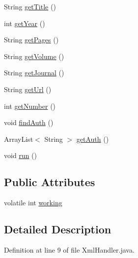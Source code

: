\begin{DoxyCompactItemize}
\item 
String \hyperlink{classXmlHandlerAuthor_a6a6fd1aaef0587d30cff05dfa53da3c3}{get\-Title} ()
\item 
int \hyperlink{classXmlHandlerAuthor_a579ee55f6cf287873e1588943ab920f5}{get\-Year} ()
\item 
String \hyperlink{classXmlHandlerAuthor_acb036e9cc36cf8e042165ec28bfd6443}{get\-Pages} ()
\item 
String \hyperlink{classXmlHandlerAuthor_a6f3d4b439bce3ce234cfaa88a94d79ba}{get\-Volume} ()
\item 
String \hyperlink{classXmlHandlerAuthor_abbd48876dd5f44b21cbd716328b356a7}{get\-Journal} ()
\item 
String \hyperlink{classXmlHandlerAuthor_ae72e80845a09b05b609558a643c8d2d3}{get\-Url} ()
\item 
int \hyperlink{classXmlHandlerAuthor_aaef6b78de7e1405878268e8203807e5d}{get\-Number} ()
\item 
void \hyperlink{classXmlHandlerAuthor_a07d49493bfa706aabe10fe0f7927aa15}{find\-Auth} ()
\item 
Array\-List$<$ String $>$ \hyperlink{classXmlHandlerAuthor_a02f6252baeefc0e7b3458af0a1cde62a}{get\-Auth} ()
\item 
void \hyperlink{classXmlHandlerAuthor_a94447769489224e0cace8278d0fddeb2}{run} ()
\end{DoxyCompactItemize}
\subsection*{Public Attributes}
\begin{DoxyCompactItemize}
\item 
volatile int \hyperlink{classXmlHandlerAuthor_a3b5ed01d09eb68532c727613932065a8}{working}
\end{DoxyCompactItemize}


\subsection{Detailed Description}


Definition at line 9 of file Xml\-Handler.\-java.



